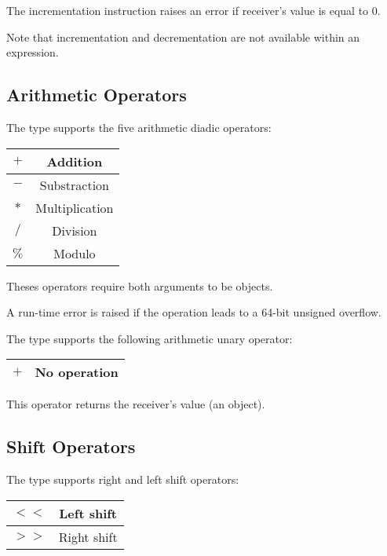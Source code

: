 The incrementation instruction raises an error if receiver's value is equal to 0.\newline

Note that incrementation and decrementation are not available within an expression.




\subsection{Arithmetic Operators}

The  type supports the five arithmetic diadic operators:\newline

\begin{tabular}{|c|c|}
\hline
$+$ & Addition \\
\hline
$-$ & Substraction \\
\hline
$*$ & Multiplication \\
\hline
$/$ & Division \\
\hline
$\%$ & Modulo \\
\hline
\end{tabular}\newline

Theses operators require both arguments to be  objects.\newline

A run-time error is raised if the operation leads to a 64-bit unsigned overflow.

The  type supports the following arithmetic unary operator:\newline

\begin{tabular}{|c|c|}
\hline
$+$ & No operation \\
\hline
\end{tabular}\newline

This operator returns the receiver's value (an   object).




\subsection{Shift Operators}


The  type supports right and left shift operators:\newline

\begin{tabular}{|c|c|}
\hline
$<<$ & Left shift \\
\hline
$>>$ & Right shift \\
\hline
\end{tabular}\newline

